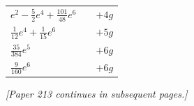 \documentclass[11pt]{article}
\begin{document}
\begin{center}
\begin{tabular}{|l|l|l|}
$e^{2}-\tfrac{5}{2}e^{4}+\tfrac{101}{48}e^{6}$          &                              & $+4g$ \\
$\tfrac{1}{12}e^{4}+\tfrac{1}{15}e^{6}$                 &                              & $+5g$ \\
$\tfrac{35}{384}e^{5}$                                  &                              & $+6g$ \\
$\tfrac{9}{160}e^{6}$                                   &                              & $+6g$ \\
\hline
\end{tabular}
\end{center}

\bigskip
\noindent\textit{[Paper 213 continues in subsequent pages.]}
\end{document}
